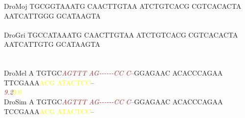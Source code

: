 \documentclass[11pt,twoside,reqno,a4paper]{article}
\begin{document}
{DroMoj	TGCGGTAAATG	CAACTTGTAA	ATCTGTCACG	CGTCACACTA	AATCATTGGG	GCATAAGTA\\
\hspace*{7\charwidth}\hspace*{1\charwidth}\hspace*{1\charwidth}\hspace*{1\charwidth}\hspace*{1\charwidth}\hspace*{1\charwidth}\\
DroGri	TGCCATAAATG	CAACTTGTAA	ATCTGTCACG	CGTCACACTA	AATCATTGTG	GCATAAGTA\\
\hspace*{7\charwidth}\hspace*{1\charwidth}\hspace*{1\charwidth}\hspace*{1\charwidth}\hspace*{1\charwidth}\hspace*{1\charwidth}\\
\\
DroMel	A	TGTGC\textit{\textcolor{Brown}{A}}\textit{\textcolor{Brown}{G}}\textit{\textcolor{Brown}{T}}\textit{\textcolor{Brown}{T}}\textit{\textcolor{Brown}{T}}	\textit{\textcolor{Brown}{A}}\textit{\textcolor{Brown}{G}}\textit{\textcolor{Brown}{-}}\textit{\textcolor{Brown}{-}}\textit{\textcolor{Brown}{-}}\textit{\textcolor{Brown}{-}}\textit{\textcolor{Brown}{-}}\textit{\textcolor{Brown}{-}}\textit{\textcolor{Brown}{C}}\textit{\textcolor{Brown}{C}}	\textit{\textcolor{Brown}{C}}--GGAGAAC	ACACCCAGAA	TTCGAAA\textcolor{Yellow}{A}\textcolor{Yellow}{C}\textcolor{Yellow}{G}	\textcolor{Yellow}{A}\textcolor{Yellow}{T}\textcolor{Yellow}{A}\textcolor{Yellow}{C}\textcolor{Yellow}{T}\textcolor{Yellow}{C}\textcolor{Yellow}{C}--\\
\hspace*{7\charwidth}\hspace*{1\charwidth}\hspace*{6\charwidth}\textit{\textcolor{Brown}{9.2}}\hspace*{1\charwidth}\hspace*{1\charwidth}\hspace*{1\charwidth}\hspace*{1\charwidth}\hspace*{39\charwidth}\textcolor{Yellow}{9.0}\hspace*{1\charwidth}\\
DroSim	A	TGTGC\textit{\textcolor{Brown}{A}}\textit{\textcolor{Brown}{G}}\textit{\textcolor{Brown}{T}}\textit{\textcolor{Brown}{T}}\textit{\textcolor{Brown}{T}}	\textit{\textcolor{Brown}{A}}\textit{\textcolor{Brown}{G}}\textit{\textcolor{Brown}{-}}\textit{\textcolor{Brown}{-}}\textit{\textcolor{Brown}{-}}\textit{\textcolor{Brown}{-}}\textit{\textcolor{Brown}{-}}\textit{\textcolor{Brown}{-}}\textit{\textcolor{Brown}{C}}\textit{\textcolor{Brown}{C}}	\textit{\textcolor{Brown}{C}}--GGAGAAC	ACACCCAGAA	TCCGAAA\textcolor{Yellow}{A}\textcolor{Yellow}{C}\textcolor{Yellow}{G}	\textcolor{Yellow}{A}\textcolor{Yellow}{T}\textcolor{Yellow}{A}\textcolor{Yellow}{C}\textcolor{Yellow}{T}\textcolor{Yellow}{C}\textcolor{Yellow}{C}--\\
}
\end{document}

